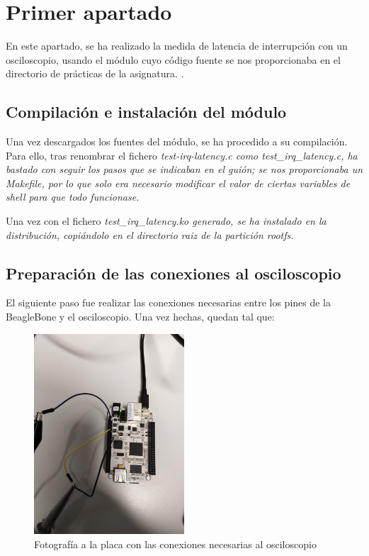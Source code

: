 \documentclass[../main.tex]{subfiles}
\begin{document}
\section{Primer apartado}

En este apartado, se ha realizado la medida de latencia de interrupción con un osciloscopio, usando el módulo cuyo código fuente se nos proporcionaba en el directorio de prácticas de la asignatura. \cite{fuentes-modulo}. 

\subsection{Compilación e instalación del módulo}

Una vez descargados los fuentes del módulo, se ha procedido a su compilación. Para ello, tras renombrar el fichero \it{test-irq-latency.c} como \it{test\_irq\_latency.c}, ha bastado con seguir los pasos que se indicaban en el guión; se nos proporcionaba un \it{Makefile}, por lo que solo era necesario modificar el valor de ciertas variables de shell para que todo funcionase.

Una vez con el fichero \it{test\_irq\_latency.ko} generado, se ha instalado en la distribución, copiándolo en el directorio raiz de la partición \it{rootfs}.

\subsection{Preparación de las conexiones al osciloscopio}

El siguiente paso fue realizar las conexiones necesarias entre los pines de la BeagleBone y el osciloscopio. Una vez hechas, quedan tal que:

\begin{figure}[h]
\centering
\includegraphics[width=0.5\textwidth]{imagenes/Apartado1-FotografiaPlaca.jpeg}
\caption{Fotografía a la placa con las conexiones necesarias al osciloscopio}
\end{figure}
\end{document}
